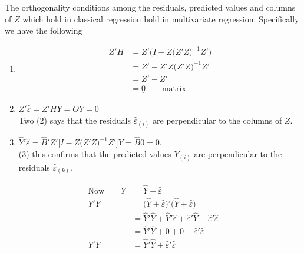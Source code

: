 \documentclass[11pt,a4paper]{article}
\theoremstyle{definition}
\begin{document}
The orthogonality conditions among the residuals, predicted values and columns of $Z$ which hold in classical regression hold in multivariate regression.
Specifically we have the following 
\begin{enumerate}
\item[(1).] 
\begin{align*}
Z'H & = Z'\big(I-Z\big(Z'Z\big)^{-1}Z'\big)\\
    & = Z'- Z'Z\big(Z'Z\big)^{-1}Z'\\
    & = Z'-Z'\\
    & = \underline{0} \qquad\text{matrix}
\end{align*}

\item[(2).] $Z'\widehat{\varepsilon} = Z'HY = OY =0$\\
Two (2) says that the residuals $\widehat{\varepsilon}_{(i)}$ are perpendicular to the columns of $Z$.

\item[(3).] $\widehat{Y}'\widehat{\varepsilon} = \widehat{B}'Z'\big[I-Z\big(Z'Z\big)^{-1}Z'\big]Y=\widehat{B} 0 =0$.\\
(3) this confirms that the predicted values $Y_{(i)}$ are perpendicular to the residuals $\widehat{\varepsilon}_{(k)}$.






\begin{figure}[H]
\centering
{}
\end{figure}





\end{enumerate}










\begin{align*}
\text{Now}\qquad   Y & = \widehat{Y} + \widehat{\varepsilon}\\
                        Y'Y & = \big(\widehat{Y}+\widehat{\varepsilon}\big)'\big(\widehat{Y}+\widehat{\varepsilon}\big)\\
                            & = \widehat{Y}'\widehat{Y} + \widehat{Y}'\widehat{\varepsilon} + \widehat{\varepsilon}'\widehat{Y} + \widehat{\varepsilon}'\widehat{\varepsilon}\\
                            & = \widehat{Y}'\widehat{Y} + 0 + 0 + \widehat{\varepsilon}'\widehat{\varepsilon}\\
                        Y'Y  & = \widehat{Y}'\widehat{Y} + \widehat{\varepsilon}'\widehat{\varepsilon}\tag{9}
\end{align*}
\end{document}
